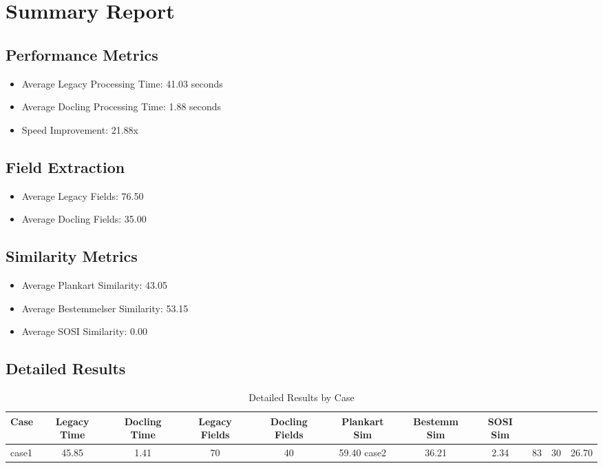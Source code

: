 \section{Summary Report}

\subsection{Performance Metrics}
\begin{itemize}
\item Average Legacy Processing Time: 41.03 seconds
\item Average Docling Processing Time: 1.88 seconds
\item Speed Improvement: 21.88x
\end{itemize}

\subsection{Field Extraction}
\begin{itemize}
\item Average Legacy Fields: 76.50
\item Average Docling Fields: 35.00
\end{itemize}

\subsection{Similarity Metrics}
\begin{itemize}
\item Average Plankart Similarity: 43.05%
\item Average Bestemmelser Similarity: 53.15%
\item Average SOSI Similarity: 0.00%
\end{itemize}

\subsection{Detailed Results}
\begin{table}[h]
\centering
\begin{tabular}{l|cc|cc|ccc}
\hline
Case & Legacy Time & Docling Time & Legacy Fields & Docling Fields & Plankart Sim & Bestemm Sim & SOSI Sim \\
\hline
case1 & 45.85 & 1.41 & 70 & 40 & 59.40%
case2 & 36.21 & 2.34 & 83 & 30 & 26.70%
\hline
\end{tabular}
\caption{Detailed Results by Case}
\end{table}
